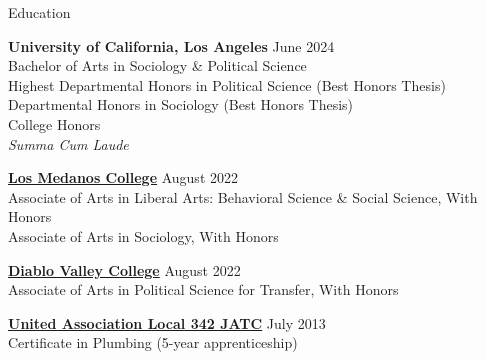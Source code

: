\documentclass[
	11pt, %
]{resume} %
\begin{document}
\thispagestyle{firstpagestyle}

\begin{samepage}
\begin{rSection}{Education}
	
	\textbf{University of California, Los Angeles} \hfill June 2024\\
	Bachelor of Arts in Sociology \& Political Science\\
	Highest Departmental Honors in Political Science (Best Honors Thesis)\\
	Departmental Honors in Sociology (Best Honors Thesis)\\
	College Honors\\
	\textit{Summa Cum Laude}

	\textbf{\href{https://www.losmedanos.edu/}{Los Medanos College}} \hfill August 2022\\ 
	Associate of Arts in Liberal Arts: Behavioral Science \& Social Science, With Honors\\
	Associate of Arts in Sociology, With Honors

	\textbf{\href{https://www.dvc.edu/}{Diablo Valley College}} \hfill August 2022\\ 
	Associate of Arts in Political Science for Transfer, With Honors
	
	\href{https://ua342.org/training}{\textbf{United Association Local 342 JATC}} \hfill July 2013\\
	Certificate in Plumbing (5-year apprenticeship)
\end{rSection}
\end{samepage}
\end{document}
